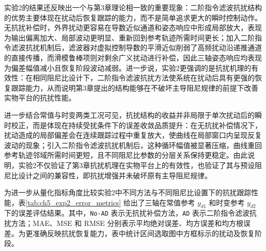 \FloatBarrier
实验2的结果还反映出一个与第3章理论相一致的重要现象：二阶指令滤波抗扰结构的优势主要体现在扰动后恢复跟踪的能力，而不是简单追求更大的瞬时控制动作。无抗扰补偿时，外界扰动更容易在导数近似通道和姿态响应中形成局部放大，表现为输出偏离加大、局部波动更明显、重新回到参考轨迹所需时间更长；加入二阶指令滤波抗扰机制后，滤波器对虚拟控制导数的平滑近似削弱了高频扰动沿递推通道的直接传播，而滑模鲁棒项则对剩余广义扰动进行补偿，因此三轴姿态响应均表现为偏差幅值减小且恢复阶段波动减弱。进一步说，实验2更强调的是抗扰机理的有效性：在相同阻尼比设计下，二阶指令滤波抗扰方法使系统在扰动后具有更强的恢复跟踪能力，从而说明第3章提出的结构能够在不破坏主导阻尼规律的前提下改善实物平台的抗扰性能。

进一步结合常值与时变两类工况可见，抗扰结构的收益并非局限于单次扰动后的瞬时校正，而是体现在持续受扰条件下的误差收敛品质提升：在无抗扰补偿情况下，扰动造成的局部偏差会在连续跟踪过程中重复放大，使曲线在局部窗口内呈现反复波动的现象；引入二阶指令滤波抗扰机制后，这种循环幅值被显著压缩，曲线重回参考轨迹邻域所需时间更短，且不同阻尼比参数的分层关系保持更稳定。由此说明，实验2不仅验证了第3章抗扰机理在实物平台上的有效性，也验证了其与预设阻尼比设计之间的兼容性，即抗扰增强并未破坏原有主导阻尼规律。

为进一步从量化指标角度比较实验2中不同方法与不同阻尼比设置下的抗扰跟踪性能，表\ref{tab:ch5_exp2_error_metrics} 给出了三轴在常值参考 $y_{d1}$ 和时变参考 $y_{d2}$ 下的误差评估结果。其中，\texttt{No-AD} 表示无抗扰补偿方法，\texttt{AD} 表示二阶指令滤波抗扰方法；MAE、MSE 和 RMSE 分别表示平均绝对误差、均方误差和均方根误差。为更准确反映抗扰恢复能力，表中统计区间选取图中方框标示的扰动及恢复阶段。

